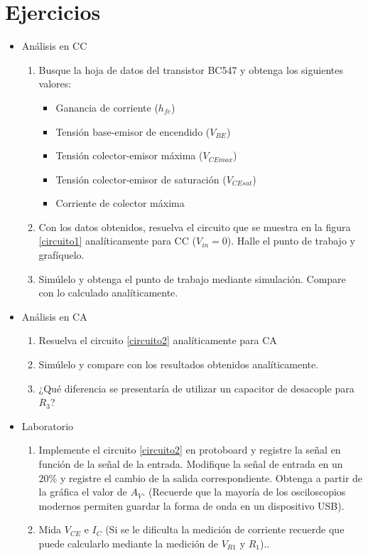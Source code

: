 \documentclass[12pt,letterpaper]{article}     %
\begin{document}
\section{Ejercicios}
\begin{mdframed}
	\begin{itemize}
		\item Análisis en CC
		\begin{enumerate}
			\item Busque la hoja de datos del transistor BC547 y obtenga los siguientes valores:
			\begin{itemize}
				\item Ganancia de corriente ($h_{fe}$)
				\item Tensión base-emisor de encendido ($V_{BE}$)
				\item Tensión colector-emisor máxima ($V_{CEmax}$)
				\item Tensión colector-emisor de saturación ($V_{CEsat}$)
				\item Corriente de colector máxima
			\end{itemize}
			\item Con los datos obtenidos, resuelva el circuito que se muestra en la figura \ref{circuito1} 
				analíticamente para CC ($V_{in}=0$). Halle el punto de trabajo y grafíquelo.
			\item Simúlelo y obtenga el punto de trabajo mediante simulación. Compare con lo calculado analíticamente.
		\end{enumerate}
		\item Análisis en CA
		\begin{enumerate}
			\item Resuelva el circuito \ref{circuito2} analíticamente para CA
			\item Simúlelo y compare con los resultados obtenidos analíticamente.
			\item ¿Qué diferencia se presentaría de utilizar un capacitor de desacople para $R_3$?
		\end{enumerate}
		\item Laboratorio
		\begin{enumerate}
			\item Implemente el circuito \ref{circuito2} en protoboard y registre la señal en función de la
				señal de la entrada. Modifique la señal de entrada en un $20\%$ y registre el
				cambio de la salida correspondiente. Obtenga a partir de la gráfica el valor
				de $A_V$. (Recuerde que la mayoría de los osciloscopios modernos permiten
				guardar la forma de onda en un dispositivo USB).
			\item Mida $V_{CE}$ e $I_C$ (Si se le dificulta la medición de corriente recuerde 
				que puede calcularlo mediante la medición de $V_{R1}$ y $R_1$)..
		\end{enumerate}
	\end{itemize}
\end{mdframed}
\end{document}
